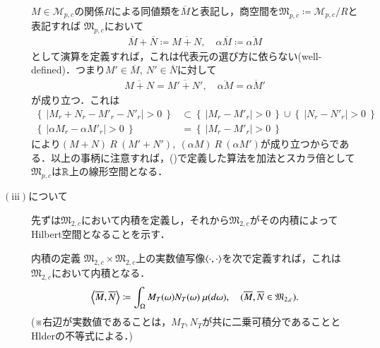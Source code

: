 \begin{description}
			$M \in \mathcal{M}_{p,c}$の関係$R$による同値類を$\overline{M}$と表記し，商空間を$\mathfrak{M}_{p,c} \coloneqq \mathcal{M}_{p,c}/R$と表記すれば
			$\mathfrak{M}_{p,c}$において
			\begin{align}
				\overline{M} + \overline{N} \coloneqq \overline{M+N}, \quad \alpha \overline{M} \coloneqq \overline{\alpha M} \label{eq:mart_linear_arithmetic}
			\end{align}
			として演算を定義すれば，これは代表元の選び方に依らない(well-defined)．つまり$M' \in \overline{M},\ N' \in \overline{N}$に対して
			\begin{align}
				\overline{M+N} = \overline{M'+N'}, \quad \overline{\alpha M} = \overline{\alpha M'}
			\end{align}
			が成り立つ．これは
			\begin{align}
				\left\{\ \left|M_r + N_r - M'_r - N'_r \right| > 0\ \right\} &\subset \left\{\ \left|M_r - M'_r \right| > 0\ \right\} \cup \left\{\ \left|N_r - N'_r \right| > 0\ \right\} \\
				\left\{\ \left|\alpha M_r - \alpha M'_r \right| > 0\ \right\} &= \left\{\ \left|M_r - M'_r \right| > 0\ \right\}
			\end{align}
			により$(M+N)\ R\ (M'+N'),\ (\alpha M)\ R\ (\alpha M')$が成り立つからである．以上の事柄に注意すれば，()で定義した算法を加法とスカラ倍として
			$\mathfrak{M}_{p,c}$は$\mathbb{R}$上の線形空間となる．
		
		\item[$\mathrm{(iii)}$について]
			先ずは$\mathfrak{M}_{2,c}$において内積を定義し，それから$\mathfrak{M}_{2,c}$がその内積によってHilbert空間となることを示す．
			\begin{itembox}[l]{内積の定義}
				$\mathfrak{M}_{2,c} \times \mathfrak{M}_{2,c}$上の実数値写像$\inprod<\cdot,\cdot>$を次で定義すれば，これは$\mathfrak{M}_{2,c}$において内積となる．
				\begin{align}
					\inprod<\overline{M},\overline{N}> \coloneqq \int_{\Omega} M_T(\omega)N_T(\omega)\ \mu(d\omega), \quad (\overline{M},\overline{N} \in \mathfrak{M}_{2,c}).
				\end{align}
				(※{\scriptsize 右辺が実数値であることは，$M_T,N_T$が共に二乗可積分であることとHlderの不等式による．})
			\end{itembox}
	

\end{description}
